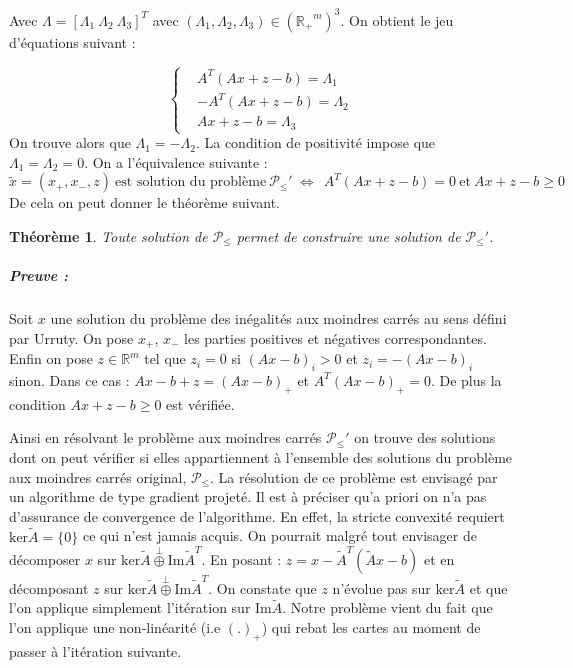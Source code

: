 \documentclass[10pt,a4paper]{article}
\newtheorem{thm}{Théorème}
\begin{document}
Avec $\Lambda = \left[ \Lambda_1 \ \Lambda_2 \ \Lambda_3 \right]^T$ avec $(\Lambda_1, \Lambda_2, \Lambda_3) \in \left(\mathbb{R_+}^m \right)^3$. On obtient le jeu d'équations suivant :

\begin{equation}
\left\lbrace
\begin{aligned}
&A^T(Ax+z-b) = \Lambda_1 \\
&-A^T(Ax+z-b)= \Lambda_2 \\
&Ax+z-b = \Lambda_3
\end{aligned}
\right.
\end{equation}
On trouve alors que $\Lambda_1 = - \Lambda_2$. La condition de positivité impose que $\Lambda_1 = \Lambda_2 = 0$. On a l'équivalence suivante :
\begin{equation}
\tilde{x}=(x_+, x_-, z) \ \text{est solution du problème} \ \mathcal{P}_{\le}' \ \Leftrightarrow \ \ A^T(Ax+z-b)=0 \ \text{et} \ Ax+z-b \ge 0
\end{equation}
De cela on peut donner le théorème suivant.
\begin{thm}
Toute solution de $\mathcal{P}_{\le}$ permet de construire une solution de $\mathcal{P}_{\le}'$.
\end{thm}
\subparagraph{Preuve :} Soit $x$ une solution du problème des inégalités aux moindres carrés au sens défini par Urruty. On pose $x_+$, $x_-$ les parties positives et négatives correspondantes. Enfin on pose $z \in \mathbb{R}^m$ tel que $z_i=0$ si $(Ax-b)_i >0$ et $z_i= -(Ax-b)_i$ sinon. Dans ce cas : $Ax-b+z=(Ax-b)_+$ et $A^T(Ax-b)_+=0$. De plus la condition $Ax+z-b \ge 0$ est vérifiée.

Ainsi en résolvant le problème aux moindres carrés $\mathcal{P}_{\le}'$ on trouve des solutions dont on peut vérifier si elles appartiennent à l'ensemble des solutions du problème aux moindres carrés original, $\mathcal{P}_{\le}$. La résolution de ce problème est envisagé par un algorithme de type gradient projeté. Il est à préciser qu'a priori on n'a pas d'assurance de convergence de l'algorithme. En effet, la stricte convexité requiert $\text{ker}\tilde{A}= \lbrace 0 \rbrace$ ce qui n'est jamais acquis. On pourrait malgré tout envisager de décomposer $x$ sur $\text{ker}\tilde{A} \overset{\perp}{\oplus} \text{Im}\tilde{A}^T$. En posant : $z = x -\tilde{A}^T(\tilde{A}x -b)$ et en décomposant $z$ sur $\text{ker}\tilde{A} \overset{\perp}{\oplus} \text{Im}\tilde{A}^T$. On constate que $z$ n'évolue pas sur $\text{ker}\tilde{A}$ et que l'on applique simplement l'itération sur $\text{Im}\tilde{A}$. Notre problème vient du fait que l'on applique une non-linéarité (i.e $(.)_+$) qui rebat les cartes au moment de passer à l'itération suivante.
\end{document}
